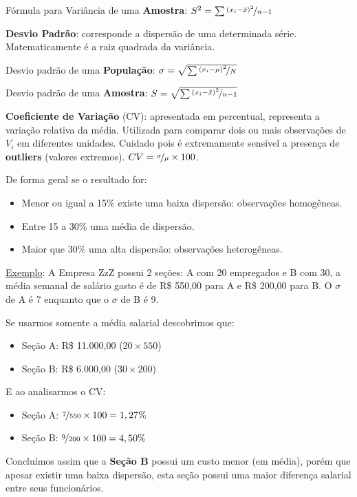\documentclass[a4paper,11pt]{article}
\begin{document}
Fórmula para Variância de uma \textbf{Amostra}: $S^2 = \sum \nicefrac{(x_{i} - \bar{x})^2}{n - 1}$

\textbf{Desvio Padrão}: corresponde a dispersão de uma determinada série. Matematicamente é a raiz quadrada da variância.

Desvio padrão de uma \textbf{População}: $\sigma =\sqrt {\sum \nicefrac{(x_{i}-\mu)^2}{N}}$

Desvio padrão de uma \textbf{Amostra}: $S =\sqrt {\sum \nicefrac{(x_{i} - \bar{x})^2}{n - 1}}$

\textbf{Coeficiente de Variação} (CV): apresentada em percentual, representa a variação relativa da média. Utilizada para comparar dois ou mais observações de $V_{i}$ em diferentes unidades. Cuidado pois é extremamente sensível a presença de \textbf{outliers} (valores extremos). $CV = \nicefrac{\sigma}{\mu} \times 100$.

De forma geral se o resultado for:
\begin{itemize}[nolistsep]
	\item Menor ou igual a 15\% existe uma baixa dispersão: observações homogêneas.
	\item Entre 15 a 30\% uma média de dispersão.
	\item Maior que 30\% uma alta dispersão: observações heterogêneas.
\end{itemize}

\underline{Exemplo}: A Empresa ZzZ possui 2 seções: A com 20 empregados e B com 30, a média semanal de salário gasto é de R\$ 550,00 para A e R\$ 200,00 para B. O $\sigma$ de A é 7 enquanto que o $\sigma$ de B é 9.

Se usarmos somente a média salarial descobrimos que: \vspace{-1em}
\begin{itemize}
	\item Seção A: R\$ 11.000,00 ($20 \times 550$)
	\item Seção B: R\$ 6.000,00 ($30 \times 200$)
\end{itemize}

E ao analisarmos o CV: \vspace{-1em}
\begin{itemize}
	\item Seção A: $\nicefrac{7}{550} \times 100 = 1,27\%$
	\item Seção B: $\nicefrac{9}{200} \times 100 = 4,50\%$
\end{itemize}

Concluímos assim que a \textbf{Seção B} possui um custo menor (em média), porém que apesar existir uma baixa dispersão, esta seção possui uma maior diferença salarial entre seus funcionários.
\end{document}
